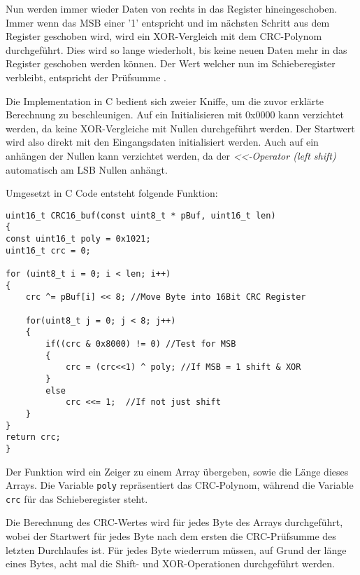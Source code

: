 \smallskip

Nun werden immer wieder Daten von rechts in das Register hineingeschoben. Immer wenn das \ac{MSB} einer '1' entspricht und im nächsten Schritt aus dem Register
geschoben wird, wird ein XOR-Vergleich mit dem CRC-Polynom durchgeführt. Dies wird so lange wiederholt, bis keine neuen Daten mehr in das Register geschoben werden können.
Der Wert welcher nun im Schieberegister verbleibt, entspricht der Prüfsumme \citep{IK_VL}.

\smallskip

Die Implementation in C bedient sich zweier Kniffe, um die zuvor erklärte Berechnung zu beschleunigen. Auf ein Initialisieren mit 0x0000 kann verzichtet werden,
da keine XOR-Vergleiche mit Nullen durchgeführt werden. Der Startwert wird also direkt mit den Eingangsdaten initialisiert werden. Auch auf ein anhängen der Nullen 
kann verzichtet werden, da der \textit{<<-Operator (left shift)} automatisch am \ac{LSB} Nullen anhängt. 

\newpage

Umgesetzt in C Code entsteht folgende Funktion: 

\begin{lstlisting}[caption={\textit{Berechnung CRC16}}]
uint16_t CRC16_buf(const uint8_t * pBuf, uint16_t len) 
{
const uint16_t poly = 0x1021;
uint16_t crc = 0;

for (uint8_t i = 0; i < len; i++)
{
    crc ^= pBuf[i] << 8; //Move Byte into 16Bit CRC Register

    for(uint8_t j = 0; j < 8; j++)
    {
        if((crc & 0x8000) != 0) //Test for MSB
        {
            crc = (crc<<1) ^ poly; //If MSB = 1 shift & XOR
        }
        else
            crc <<= 1;	//If not just shift
    }
}
return crc;
}
\end{lstlisting}

Der Funktion wird ein Zeiger zu einem Array übergeben, sowie die Länge dieses Arrays. Die Variable \lstinline!poly! repräsentiert das CRC-Polynom,
während die Variable \lstinline!crc! für das Schieberegister steht.

\smallskip

Die Berechnung des CRC-Wertes wird für jedes Byte des Arrays durchgeführt, wobei der Startwert für jedes Byte nach dem ersten die CRC-Prüfsumme des 
letzten Durchlaufes ist. Für jedes Byte wiederrum müssen, auf Grund der länge eines Bytes, acht mal die Shift- und XOR-Operationen durchgeführt werden.

\smallskip

